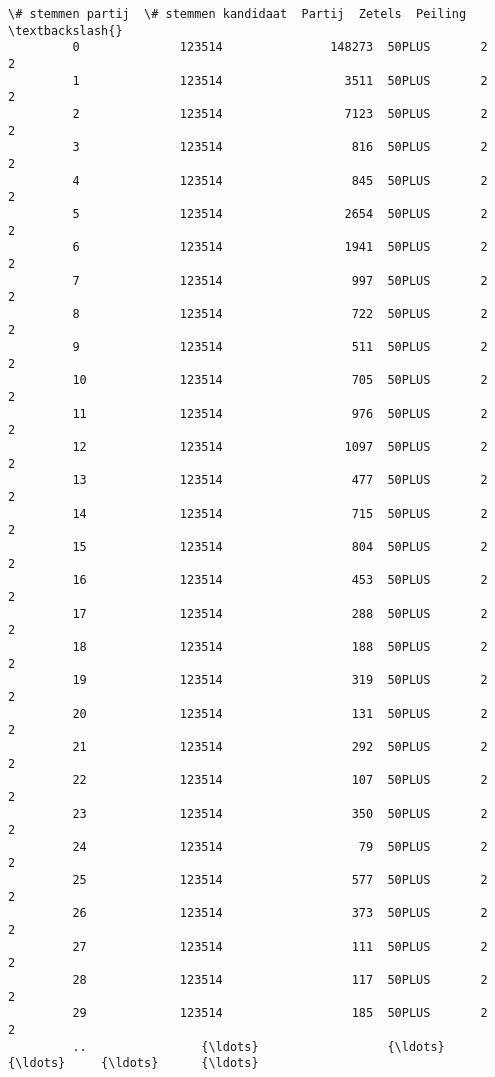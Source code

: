 \documentclass{article}
\begin{document}
\begin{Verbatim}[commandchars=\\\{\}]
              \# stemmen partij  \# stemmen kandidaat  Partij  Zetels  Peiling  \textbackslash{}
         0              123514               148273  50PLUS       2        2   
         1              123514                 3511  50PLUS       2        2   
         2              123514                 7123  50PLUS       2        2   
         3              123514                  816  50PLUS       2        2   
         4              123514                  845  50PLUS       2        2   
         5              123514                 2654  50PLUS       2        2   
         6              123514                 1941  50PLUS       2        2   
         7              123514                  997  50PLUS       2        2   
         8              123514                  722  50PLUS       2        2   
         9              123514                  511  50PLUS       2        2   
         10             123514                  705  50PLUS       2        2   
         11             123514                  976  50PLUS       2        2   
         12             123514                 1097  50PLUS       2        2   
         13             123514                  477  50PLUS       2        2   
         14             123514                  715  50PLUS       2        2   
         15             123514                  804  50PLUS       2        2   
         16             123514                  453  50PLUS       2        2   
         17             123514                  288  50PLUS       2        2   
         18             123514                  188  50PLUS       2        2   
         19             123514                  319  50PLUS       2        2   
         20             123514                  131  50PLUS       2        2   
         21             123514                  292  50PLUS       2        2   
         22             123514                  107  50PLUS       2        2   
         23             123514                  350  50PLUS       2        2   
         24             123514                   79  50PLUS       2        2   
         25             123514                  577  50PLUS       2        2   
         26             123514                  373  50PLUS       2        2   
         27             123514                  111  50PLUS       2        2   
         28             123514                  117  50PLUS       2        2   
         29             123514                  185  50PLUS       2        2   
         ..                {\ldots}                  {\ldots}     {\ldots}     {\ldots}      {\ldots}   

\end{Verbatim}
\end{document}
